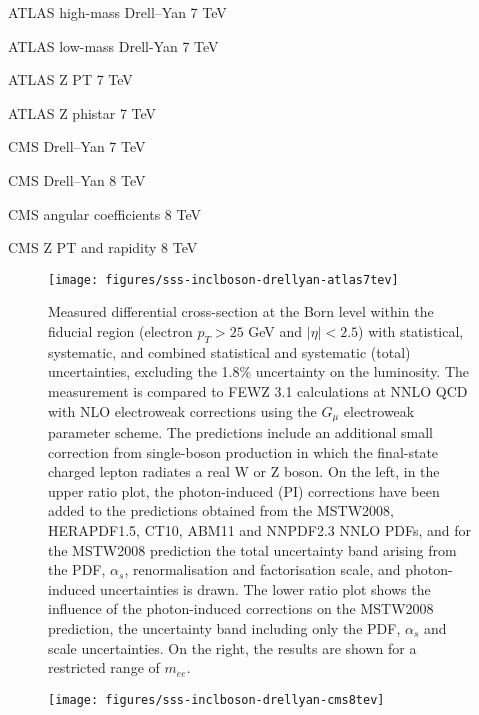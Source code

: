 ATLAS high-mass Drell--Yan 7 TeV~\cite{Aad:2013iua} 

ATLAS low-mass Drell-Yan 7 TeV~\cite{Aad:2014qja}

ATLAS Z PT 7 TeV~\cite{Aad:2014xaa}

ATLAS Z phistar 7 TeV~\cite{Aad:2012wfa}

CMS Drell--Yan 7 TeV~\cite{Chatrchyan:2013tia}

CMS Drell--Yan 8 TeV~\cite{CMS:2014jea}

CMS angular coefficients 8 TeV~\cite{Khachatryan:2015paa}

CMS Z PT and rapidity 8 TeV~\cite{Khachatryan:2015oaa}

\begin{figure}[p]
    \centering
    \texttt{[image: figures/sss-inclboson-drellyan-atlas7tev]}
    \caption{Measured differential cross-section at the Born level within the fiducial region (electron $p_T > 25$ GeV and $|\eta| < 2.5$) with statistical, systematic, and combined statistical and systematic (total) uncertainties, excluding the 1.8\% uncertainty on the luminosity. The measurement is compared to FEWZ 3.1 calculations at NNLO QCD with NLO electroweak corrections using the $G_{\mu}$ electroweak parameter scheme. The predictions include an additional small correction from single-boson production in which the final-state charged lepton radiates a real W or Z boson. On the left, in the upper ratio plot, the photon-induced (PI) corrections have been added to the predictions obtained from the MSTW2008, HERAPDF1.5, CT10, ABM11 and NNPDF2.3 NNLO PDFs, and for the MSTW2008 prediction the total uncertainty band arising from the PDF, $\alpha_s$, renormalisation and factorisation scale, and photon-induced uncertainties is drawn. The lower ratio plot shows the influence of the photon-induced corrections on the MSTW2008 prediction, the uncertainty band including only the PDF, $\alpha_s$ and scale uncertainties. On the right, the results are shown for a restricted range of $m_{ee}$.}
    \label{fig:sss-inclboson-drellyan-atlas7tev}
\end{figure}

\begin{figure}[p]
    \centering
    \texttt{[image: figures/sss-inclboson-drellyan-cms8tev]}
    \caption{}
    \label{fig:sss-inclboson-drellyan-cms8tev}
\end{figure}

